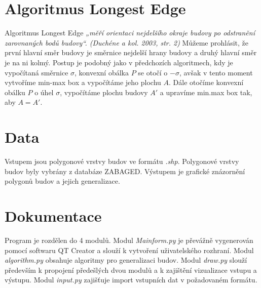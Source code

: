 \documentclass{article}
\begin{document}
\section{\small{Algoritmus Longest Edge}}
Algoritmus Longest Edge \textit{„měří orientaci nejdelšího okraje budovy po odstranění zarovnaných bodů budovy“. (Duchéne a kol. 2003, str. 2)} Můžeme prohlásit, že první hlavní směr budovy je směrnice nejdelší hrany budovy a druhý hlavní směr je na ni kolmý.
Postup je podobný jako v předchozích algoritmech, kdy je vypočítaná směrnice $\sigma$, konvexní obálka $P$ se otočí o $-\sigma$, avšak v tento moment vytvoříme min-max box a vypočítáme jeho plochu $A$. Dále otočíme konvexní obálku $P$ o úhel $\sigma$, vypočítáme plochu budovy $A'$ a upravíme min.max box tak, aby $A = A'$.
\section{\large{Data}}
Vstupem jsou polygonové vrstvy budov ve formátu \emph{.shp}. Polygonové vrstvy budov byly vybrány z databáze ZABAGED. Výstupem je grafické znázornění polygonů budov a jejich generalizace.
\section{\large{Dokumentace}}
Program je rozdělen do 4 modulů. Modul \emph{Mainform.py} je převážně vygenerován pomocí softwaru QT Creator a slouží k vytvoření uživatelského rozhraní. Modul \emph{algorithm.py} obsahuje algoritmy pro generalizaci budov. Modul \emph{draw.py} slouží především k propojení předešlých dvou modulů a k zajištění vizualizace vstupu a výstupu. Modul \emph{input.py} zajišťuje import vstupních dat v požadovaném formátu.
\end{document}
